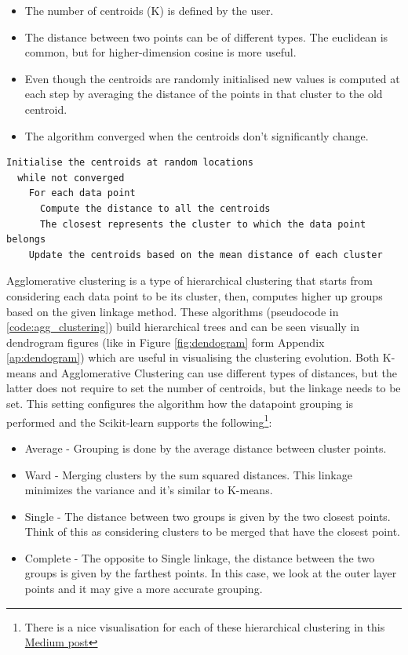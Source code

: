 \begin{itemize}
  \item The number of centroids (K) is defined by the user.
  \item The distance between two points can be of different types. The euclidean is common, but for higher-dimension cosine is more useful.
  \item Even though the centroids are randomly initialised new values is computed at each step by averaging the distance of the points in that cluster to the old centroid.
  \item The algorithm converged when the centroids don't significantly change.
\end{itemize}

\begin{lstlisting}[caption={K-means pseudocode}, label={code:k-means}]
  Initialise the centroids at random locations
  while not converged 
    For each data point
      Compute the distance to all the centroids
      The closest represents the cluster to which the data point belongs
    Update the centroids based on the mean distance of each cluster
\end{lstlisting} 

Agglomerative clustering is a type of hierarchical clustering that starts from considering each data point to be its cluster, then, computes higher up groups based on the given linkage method. These algorithms (pseudocode in \ref{code:agg_clustering}) build hierarchical trees and can be seen visually in dendrogram figures (like in Figure \ref{fig:dendogram} form Appendix \ref{ap:dendogram}) which are useful in visualising the clustering evolution. Both K-means and Agglomerative Clustering can use different types of distances, but the latter does not require to set the number of centroids, but the linkage needs to be set. This setting configures the algorithm how the datapoint grouping is performed and the Scikit-learn supports the following\footnote{
  There is a nice visualisation for each of these hierarchical clustering in this \href{https://towardsdatascience.com/machine-learning-algorithms-part-12-hierarchical-agglomerative-clustering-example-in-python-1e18e0075019}{Medium post} }:
\begin{itemize}
  \item Average - Grouping is done by the average distance between cluster points.
  \item Ward - Merging clusters by the sum squared distances. This linkage minimizes the variance and it's similar to K-means.
  \item Single - The distance between two groups is given by the two closest points. Think of this as considering clusters to be merged that have the closest point.
  \item Complete - The opposite to Single linkage, the distance between the two groups is given by the farthest points. In this case, we look at the outer layer points and it may give a more accurate grouping.
\end{itemize}


